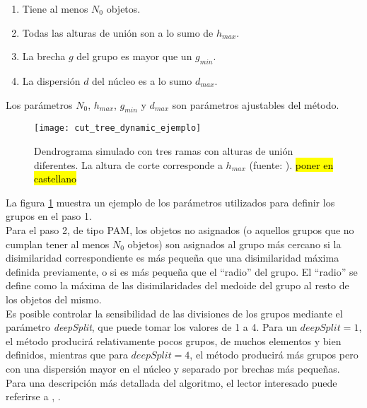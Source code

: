 \begin{enumerate}
\item Tiene al menos $N_0$ objetos.
\item Todas las alturas de unión son a lo sumo de $h_{max}$.
\item La brecha $g$ del grupo es mayor que un $g_{min}$.
\item La dispersión $d$ del núcleo es a lo sumo $d_{max}$.
\end{enumerate}
Los parámetros $N_0$, $h_{max}$, $g_{min}$ y $d_{max}$ son parámetros ajustables del método.
\begin{figure}[h]
    \centering
    \texttt{[image: cut\_tree\_dynamic\_ejemplo]}
    \caption{Dendrograma simulado con tres ramas con alturas de unión diferentes. La altura de corte corresponde a $h_{max}$ (fuente: \cite{Langfelder2008}). \hl{poner en castellano}}
    \label{fig:cut_tree_dynamic_ejemplo}
\end{figure}
La figura \ref{fig:cut_tree_dynamic_ejemplo} muestra un ejemplo de los parámetros utilizados para definir los grupos en el paso 1.\\
Para el paso 2, de tipo PAM, los objetos no asignados (o aquellos grupos que no cumplan tener al menos $N_0$ objetos) son asignados al grupo más cercano si la disimilaridad correspondiente es más pequeña que una disimilaridad máxima definida previamente, o si es más pequeña que el ``radio'' del grupo. El ``radio'' se define como la máxima de las disimilaridades del medoide del grupo al resto de los objetos del mismo.\\
Es posible controlar la sensibilidad de las divisiones de los grupos mediante el parámetro \textit{deepSplit}, que puede tomar los valores de 1 a 4. Para un $deepSplit=1$, el método producirá relativamente pocos grupos, de muchos elementos y bien definidos, mientras que para $deepSplit=4$, el método producirá más grupos pero con una dispersión mayor en el núcleo y separado por brechas más pequeñas.\\
Para una descripción más detallada del algoritmo, el lector interesado puede referirse a \cite{Langfelder2008}, \cite{Langfelder2007}.


